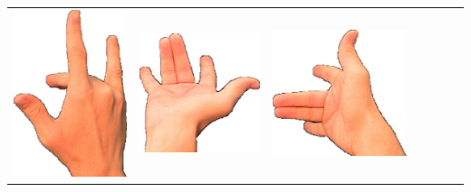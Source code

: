 \documentclass{article}
\begin{document}
\begin{center}
\begin{tabular}{r*{6}{c}}
\includegraphics[scale=0.1]{images/06-10-3.jpg}&
\includegraphics[scale=0.1]{images/06-10-4.jpg}&
\includegraphics[scale=0.1]{images/06-10-5.jpg}&

\end{tabular}
\end{center}
\end{document}
